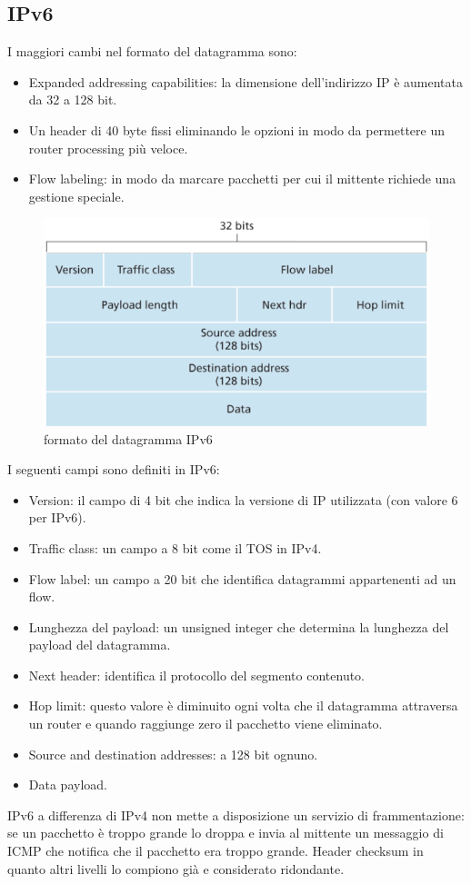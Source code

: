 \subsection{IPv6}
I maggiori cambi nel formato del datagramma sono:
\begin{itemize}
\item Expanded addressing capabilities: la dimensione dell'indirizzo IP \`e aumentata da 32 a 128 bit. 
\item Un header di 40 byte fissi eliminando le opzioni in modo da permettere un router processing pi\`u veloce.
\item Flow labeling: in modo da marcare pacchetti per cui il mittente richiede una gestione speciale. 
\end{itemize}
\begin{figure}[h]
\includegraphics[width=\textwidth]{IPv6Datagram.png}
\caption{formato del datagramma IPv6}
\end{figure}
I seguenti campi sono definiti in IPv6:
\begin{itemize}
\item Version: il campo di 4 bit che indica la versione di IP utilizzata (con valore 6 per IPv6).
\item Traffic class: un campo a 8 bit come il TOS in IPv4.
\item Flow label: un campo a 20 bit che identifica datagrammi appartenenti ad un flow.
\item Lunghezza del payload: un unsigned integer che determina la lunghezza del payload del datagramma. 
\item Next header: identifica il protocollo del segmento contenuto.
\item Hop limit: questo valore \`e diminuito ogni volta che il datagramma attraversa un router e quando raggiunge zero il pacchetto viene eliminato.
\item Source and destination addresses: a 128 bit ognuno.
\item Data payload.
\end{itemize}
IPv6 a differenza di IPv4 non mette a disposizione un servizio di frammentazione: se un pacchetto \`e troppo grande lo droppa e invia al mittente un 
messaggio di ICMP che notifica che il pacchetto era troppo grande. Header checksum in quanto altri livelli lo compiono gi\`a e considerato ridondante. 
